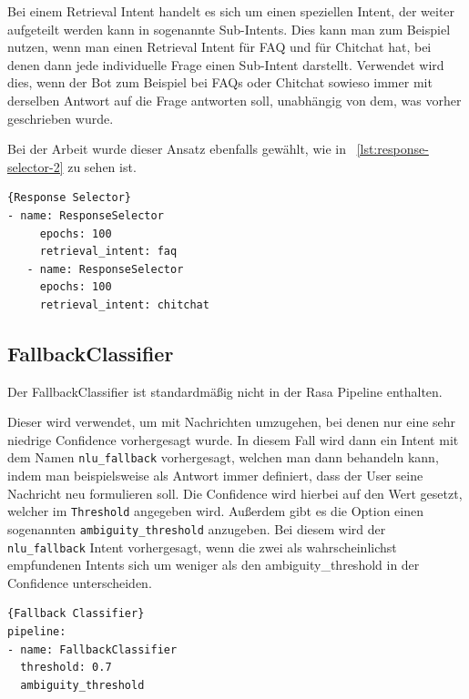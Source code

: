 Bei einem Retrieval Intent handelt es sich um einen speziellen Intent, der weiter aufgeteilt werden kann in sogenannte Sub-Intents.
Dies kann man zum Beispiel nutzen, wenn man einen Retrieval Intent für FAQ und für Chitchat hat, bei denen dann jede individuelle Frage einen Sub-Intent darstellt.\cite{retrievalIntent}
Verwendet wird dies, wenn der Bot zum Beispiel bei FAQs oder Chitchat sowieso immer mit derselben Antwort auf die Frage antworten soll, unabhängig von dem, was vorher geschrieben wurde.\cite{chitchatAndFaqs}

Bei der Arbeit wurde dieser Ansatz ebenfalls gewählt, wie in ~\ref{lst:response-selector-2} zu sehen ist.

\begin{lstlisting}[label={lst:response-selector-2},caption={Response Selector für Chitchat und FAQ}]{Response Selector}
- name: ResponseSelector
     epochs: 100
     retrieval_intent: faq
   - name: ResponseSelector
     epochs: 100
     retrieval_intent: chitchat
\end{lstlisting}

\subsection{FallbackClassifier}\label{subsec:fallback-classifier}

Der FallbackClassifier ist standardmäßig nicht in der Rasa Pipeline enthalten.\cite{startingPipelines}

Dieser wird verwendet, um mit Nachrichten umzugehen, bei denen nur eine sehr niedrige Confidence vorhergesagt wurde.
In diesem Fall wird dann ein Intent mit dem Namen \texttt{nlu\_fallback} vorhergesagt, welchen man dann behandeln kann, indem man beispielsweise als Antwort immer definiert, dass der User seine Nachricht neu formulieren soll.
Die Confidence wird hierbei auf den Wert gesetzt, welcher im \texttt{Threshold} angegeben wird.\cite{fallbackClassifier, nluFallback}
Außerdem gibt es die Option einen sogenannten \texttt{ambiguity\_threshold} anzugeben.
Bei diesem wird der \texttt{nlu\_fallback} Intent vorhergesagt, wenn die zwei als wahrscheinlichst empfundenen Intents sich um weniger als den ambiguity\_threshold in der Confidence unterscheiden.\cite{fallbackClassifier}

\begin{lstlisting}[label={lst:fallback-classifier},caption={Fallback Classifier}]{Fallback Classifier}
pipeline:
- name: FallbackClassifier
  threshold: 0.7
  ambiguity_threshold
\end{lstlisting}


